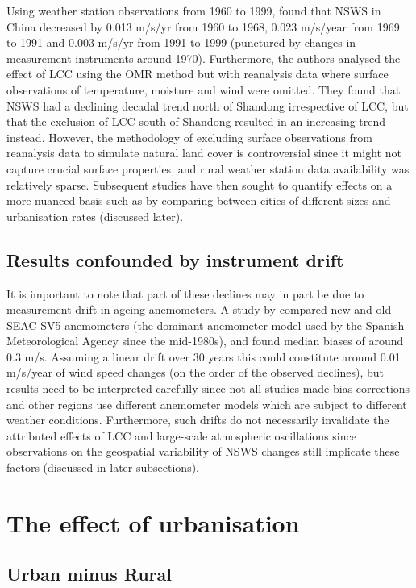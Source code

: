 Using weather station observations from 1960 to 1999, \citet{li2008} found that \ac{NSWS} in China decreased by 0.013 m/s/yr from 1960 to 1968, 0.023 m/s/year from 1969 to 1991 and 0.003 m/s/yr from 1991 to 1999 (punctured by changes in measurement instruments around 1970). Furthermore, the authors analysed the effect of \ac{LCC} using the \ac{OMR} method but with reanalysis data where surface observations of temperature, moisture and wind were omitted. They found that \ac{NSWS} had a declining decadal trend north of Shandong irrespective of \ac{LCC}, but that the exclusion of \ac{LCC} south of Shandong resulted in an increasing trend instead. However, the methodology of excluding surface observations from reanalysis data to simulate natural land cover is controversial since it might not capture crucial surface properties, and rural weather station data availability was relatively sparse. Subsequent studies have then sought to quantify effects on a more nuanced basis such as by comparing between cities of different sizes and urbanisation rates (discussed later).

\subsection{Results confounded by instrument drift}

It is important to note that part of these declines may in part be due to measurement drift in ageing anemometers. A study by \citet{azorin-molina2018_drift} compared new and old SEAC SV5 anemometers (the dominant anemometer model used by the Spanish Meteorological Agency since the mid-1980s), and found median biases of around 0.3 m/s. Assuming a linear drift over 30 years this could constitute around 0.01 m/s/year of wind speed changes (on the order of the observed declines), but results need to be interpreted carefully since not all studies made bias corrections and other regions use different anemometer models which are subject to different weather conditions. Furthermore, such drifts do not necessarily invalidate the attributed effects of \ac{LCC} and large-scale atmospheric oscillations since observations on the geospatial variability of \ac{NSWS} changes still implicate these factors (discussed in later subsections).

\section{The effect of urbanisation}

\subsection{Urban minus Rural}

